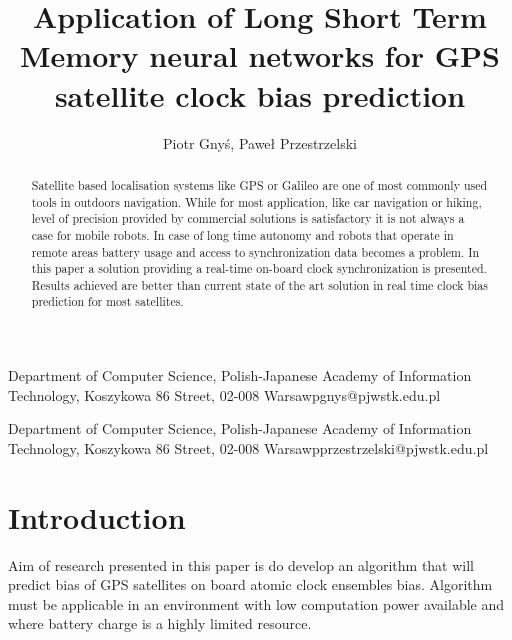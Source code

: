 \documentclass{kybernetika}
\begin{document}
\pagestyle{myheadings}
\title{Application of Long Short Term Memory neural networks for GPS satellite clock 
bias prediction}

\author{Piotr Gny\'{s}, Pawe\l{} Przestrzelski}

{Department of Computer Science,  Polish-Japanese Academy of Information Technology,
Koszykowa 86 Street, 02-008 Warsaw}{pgnys@pjwstk.edu.pl}

{Department of Computer Science,  Polish-Japanese Academy of Information Technology,
Koszykowa 86 Street, 02-008 Warsaw}{pprzestrzelski@pjwstk.edu.pl}


\maketitle

\begin{abstract}
Satellite based localisation systems like GPS or Galileo are one of most commonly used tools
in outdoors navigation. While for most application, like car navigation or hiking, level of
precision provided by commercial solutions is satisfactory it is not always a case for mobile
robots. In case of long time autonomy and robots that operate in remote areas battery usage
and access to synchronization data becomes a problem. In this paper a solution providing a 
real-time on-board clock synchronization is presented. Results achieved are better than current
state of the art solution in real time clock bias prediction for most satellites.
\end{abstract}




\section{Introduction}
Aim of research presented in this paper is do develop an algorithm that will predict bias of
GPS satellites on board atomic clock ensembles bias. Algorithm must be applicable in an 
environment with low computation power available and where battery charge is a highly limited
resource.
\end{document}
